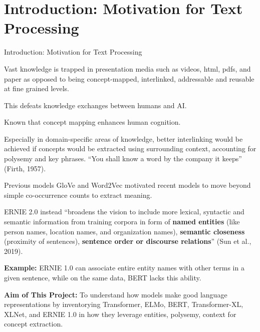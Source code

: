 
\section{Introduction: Motivation for Text Processing}


\begin{frame}{Introduction: Motivation for Text Processing} %



\begin{itemizeSpaced}{5pt}

    \item Vast knowledge is trapped in presentation media such as videos, html, pdfs, and paper as opposed to being concept-mapped, interlinked, addressable and reusable at fine grained levels.
    
    \item This defeats knowledge exchanges between humans and AI.
    
    \item Known that concept mapping enhances human cognition. 
    
    \item Especially in domain-specific areas of knowledge, better interlinking would be achieved if concepts would be extracted using surrounding context, accounting for polysemy and key phrases. “You shall know a word by the company it keeps” (Firth, 1957).
    
    
    \item Previous models GloVe and Word2Vec motivated recent models to move beyond simple co-occurrence counts to extract meaning. 
    
    \item ERNIE 2.0 instead “broadens the vision to include more lexical, syntactic and semantic information from training corpora in form of \textbf{named entities} (like person names, location names, and organization names), \textbf{semantic closeness} (proximity of sentences), \textbf{sentence order or discourse relations}” (Sun et al., 2019). 
    
    \item \textbf{Example:} ERNIE 1.0 can associate entire entity names with other terms in a given sentence, while on the same data, BERT lacks this ability.
    
    \item \textbf{Aim of This Project: } To understand how models make good language representations by inventorying Transformer, ELMo, BERT, Transformer-XL, XLNet, and ERNIE 1.0 in how they leverage entities, polysemy, context for concept extraction. 
    
    
\end{itemizeSpaced}
\end{frame}






